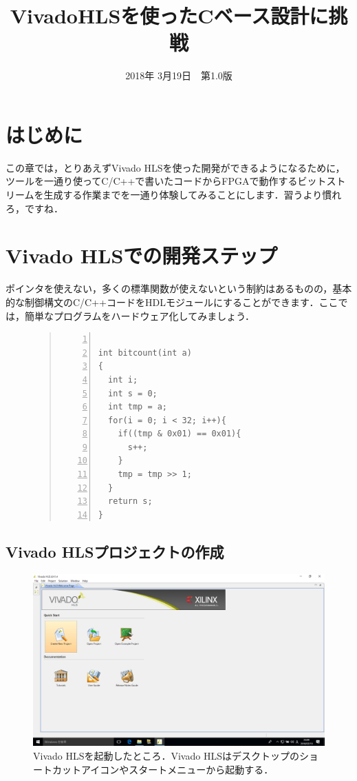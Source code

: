 \documentclass[a4paper,dvipdfmx]{jsarticle}
\begin{document}
\title{VivadoHLSを使ったCベース設計に挑戦}
\author{}
\date{2018年 3月19日~~第1.0版}
\maketitle

\section{はじめに}
この章では，とりあえずVivado HLSを使った開発ができるようになるために，ツールを一通り使ってC/C++で書いたコードからFPGAで動作するビットストリームを生成する作業までを一通り体験してみることにします．習うより慣れろ，ですね．

\section{Vivado HLSでの開発ステップ}
ポインタを使えない，多くの標準関数が使えないという制約はあるものの，基本的な制御構文のC/C++コードをHDLモジュールにすることができます．ここでは，簡単なプログラムをハードウェア化してみましょう．

\begin{figure}[H]
\begin{quote}
\begin{Verbatim}[frame=single, numbers=left, baselinestretch=0.8]

int bitcount(int a)
{
  int i;
  int s = 0;
  int tmp = a;
  for(i = 0; i < 32; i++){
    if((tmp & 0x01) == 0x01){
      s++;
    }
    tmp = tmp >> 1;
  }
  return s;
}
  \end{Verbatim}
 \end{quote}
\end{figure}

 \subsection{Vivado HLSプロジェクトの作成}

 \begin{figure}[H]
  \begin{center}
   \includegraphics[width=.8\textwidth]{chapter08_figures/VirtualBox_Windows10_19_03_2018_23_09_20.png}
  \end{center}
  \caption{Vivado HLSを起動したところ．Vivado HLSはデスクトップのショートカットアイコンやスタートメニューから起動する．}
 \end{figure}
\end{document}
